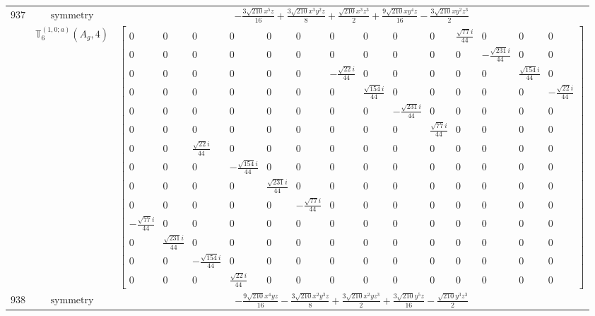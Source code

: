 \documentclass[fleqn,8pt,landscape]{jsarticle}
\begin{document}
\begin{longtable}{ccc}
$ 937 $ & $ \text{symmetry} $ & $ - \frac{3 \sqrt{210} x^{5} z}{16} + \frac{3 \sqrt{210} x^{3} y^{2} z}{8} + \frac{\sqrt{210} x^{3} z^{3}}{2} + \frac{9 \sqrt{210} x y^{4} z}{16} - \frac{3 \sqrt{210} x y^{2} z^{3}}{2} $ \\
$  $ & $ \mathbb{T}_{6}^{(1,0;a)}(A_{g},4) $ & $ \begin{bmatrix} 0 & 0 & 0 & 0 & 0 & 0 & 0 & 0 & 0 & 0 & \frac{\sqrt{77} i}{44} & 0 & 0 & 0 \\ 0 & 0 & 0 & 0 & 0 & 0 & 0 & 0 & 0 & 0 & 0 & - \frac{\sqrt{231} i}{44} & 0 & 0 \\ 0 & 0 & 0 & 0 & 0 & 0 & - \frac{\sqrt{22} i}{44} & 0 & 0 & 0 & 0 & 0 & \frac{\sqrt{154} i}{44} & 0 \\ 0 & 0 & 0 & 0 & 0 & 0 & 0 & \frac{\sqrt{154} i}{44} & 0 & 0 & 0 & 0 & 0 & - \frac{\sqrt{22} i}{44} \\ 0 & 0 & 0 & 0 & 0 & 0 & 0 & 0 & - \frac{\sqrt{231} i}{44} & 0 & 0 & 0 & 0 & 0 \\ 0 & 0 & 0 & 0 & 0 & 0 & 0 & 0 & 0 & \frac{\sqrt{77} i}{44} & 0 & 0 & 0 & 0 \\ 0 & 0 & \frac{\sqrt{22} i}{44} & 0 & 0 & 0 & 0 & 0 & 0 & 0 & 0 & 0 & 0 & 0 \\ 0 & 0 & 0 & - \frac{\sqrt{154} i}{44} & 0 & 0 & 0 & 0 & 0 & 0 & 0 & 0 & 0 & 0 \\ 0 & 0 & 0 & 0 & \frac{\sqrt{231} i}{44} & 0 & 0 & 0 & 0 & 0 & 0 & 0 & 0 & 0 \\ 0 & 0 & 0 & 0 & 0 & - \frac{\sqrt{77} i}{44} & 0 & 0 & 0 & 0 & 0 & 0 & 0 & 0 \\ - \frac{\sqrt{77} i}{44} & 0 & 0 & 0 & 0 & 0 & 0 & 0 & 0 & 0 & 0 & 0 & 0 & 0 \\ 0 & \frac{\sqrt{231} i}{44} & 0 & 0 & 0 & 0 & 0 & 0 & 0 & 0 & 0 & 0 & 0 & 0 \\ 0 & 0 & - \frac{\sqrt{154} i}{44} & 0 & 0 & 0 & 0 & 0 & 0 & 0 & 0 & 0 & 0 & 0 \\ 0 & 0 & 0 & \frac{\sqrt{22} i}{44} & 0 & 0 & 0 & 0 & 0 & 0 & 0 & 0 & 0 & 0 \end{bmatrix} $ \\ \hline
$ 938 $ & $ \text{symmetry} $ & $ - \frac{9 \sqrt{210} x^{4} y z}{16} - \frac{3 \sqrt{210} x^{2} y^{3} z}{8} + \frac{3 \sqrt{210} x^{2} y z^{3}}{2} + \frac{3 \sqrt{210} y^{5} z}{16} - \frac{\sqrt{210} y^{3} z^{3}}{2} $ \\

\end{longtable}
\end{document}
